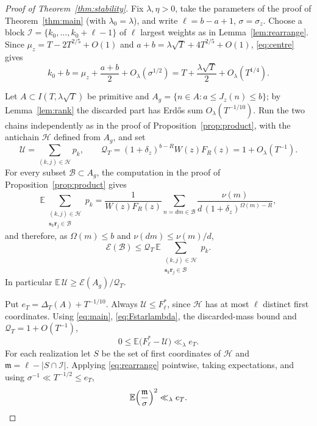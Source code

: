 \documentclass[11pt,a4paper]{article}
\numberwithin{equation}{section}
\theoremstyle{plain}
\theoremstyle{definition}
\theoremstyle{remark}
\newcommand{\EE}{\mathbb{E}}
\newcommand{\cE}{\mathcal{E}}
\newcommand{\cH}{\mathcal{H}}
\newcommand{\cI}{\mathcal{I}}
\newcommand{\cU}{\mathcal{U}}
\newcommand{\cB}{\mathcal{B}}
\newcommand{\cQ}{\mathcal{Q}}
\newcommand{\fm}{\mathfrak{m}}
\newcommand{\bs}{\mathbf{s}}
\newcommand{\br}{\mathbf{r}}
\begin{document}
\begin{proof}[Proof of Theorem~\ref{thm:stability}]
Fix $\lambda,\eta>0$, take the parameters of the proof of Theorem~\ref{thm:main} (with $\lambda_0=\lambda$), and write $\ell=b-a+1$, $\sigma=\sigma_z$. Choose a block $\cI=\{k_0,\dots,k_0+\ell-1\}$ of $\ell$ largest weights as in Lemma~\ref{lem:rearrange}. Since $\mu_z=T-2T^{2/5}+O(1)$ and $a+b=\lambda\sqrt T+4T^{2/5}+O(1)$, \eqref{eq:centre} gives
\begin{equation}\label{eq:k0b}
k_0+b=\mu_z+\frac{a+b}{2}+O_\lambda(\sigma^{1/2})=T+\frac{\lambda\sqrt T}2+O_\lambda(T^{1/4}).
\end{equation}

Let $A\subset I(T,\lambda\sqrt T)$ be primitive and $A_g=\{n\in A: a\le J_z(n)\le b\}$; by Lemma~\ref{lem:rank} the discarded part has Erd\H{o}s sum $O_\lambda(T^{-1/10})$. Run the two chains independently as in the proof of Proposition~\ref{prop:product}, with the antichain $\cH$ defined from $A_g$, and set
\[
\cU=\sum_{(k,j)\in\cH}p_k,\qquad \cQ_T=(1+\delta_z)^{b-R}W(z)F_R(z)=1+O_\lambda(T^{-1}).
\]
For every subset $\cB\subset A_g$, the computation in the proof of Proposition~\ref{prop:product} gives
\[
\EE\sum_{\substack{(k,j)\in\cH\\ \bs_k\br_j\in\cB}}p_k=\frac{1}{W(z)F_R(z)}\sum_{n=dm\in\cB}\frac{\nu(m)}{d\,(1+\delta_z)^{\Omega(m)-R}},
\]
and therefore, as $\Omega(m)\le b$ and $\nu(dm)\le\nu(m)/d$,
\begin{equation}\label{eq:subset}
\cE(\cB)\le\cQ_T\,\EE\sum_{\substack{(k,j)\in\cH\\ \bs_k\br_j\in\cB}}p_k .
\end{equation}
In particular $\EE\,\cU\ge\cE(A_g)/\cQ_T$.

Put $e_T=\Delta_T(A)+T^{-1/10}$. Always $\cU\le F^*_\ell$, since $\cH$ has at most $\ell$ distinct first coordinates. Using \eqref{eq:main}, \eqref{eq:Fstarlambda}, the discarded-mass bound and $\cQ_T=1+O(T^{-1})$,
\begin{equation}\label{eq:expdef}
0\le\EE\bigl(F^*_\ell-\cU\bigr)\ll_\lambda e_T .
\end{equation}
For each realization let $S$ be the set of first coordinates of $\cH$ and $\fm=\ell-|S\cap\cI|$. Applying \eqref{eq:rearrange} pointwise, taking expectations, and using $\sigma^{-1}\ll T^{-1/2}\le e_T$,
\begin{equation}\label{eq:m2}
\EE\Bigl(\frac{\fm}{\sigma}\Bigr)^2\ll_\lambda e_T .
\end{equation}


\end{proof}
\end{document}
